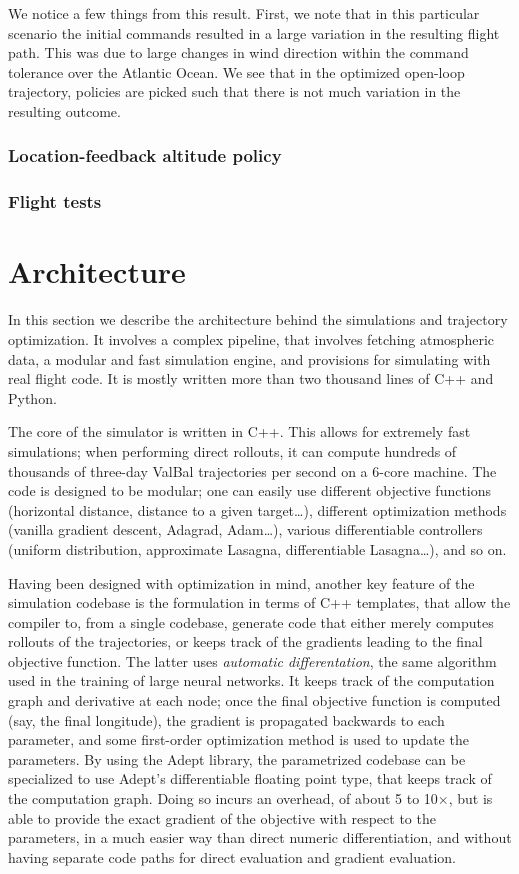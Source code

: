\documentclass[11pt]{scrartcl} %
\begin{document}
We notice a few things from this result. First, we note that in this particular scenario the initial commands resulted in a large variation in the resulting flight path. This was due to large changes in wind direction within the command tolerance over the Atlantic Ocean. We see that in the optimized open-loop trajectory, policies are picked such that there is not much variation in the resulting outcome. 
\subsubsection{Location-feedback altitude policy}
\subsubsection{Flight tests}


\newpage
\section{Architecture}
\label{arch}
In this section we describe the architecture behind the simulations and trajectory optimization. It involves a complex pipeline, that involves fetching atmospheric data, a modular and fast simulation engine, and provisions for simulating with real flight code. It is mostly written more than two thousand lines of C++ and Python.

The core of the simulator is written in C++. This allows for extremely fast simulations; when performing direct rollouts, it can compute hundreds of thousands of three-day ValBal trajectories per second on a 6-core machine. The code is designed to be modular; one can easily use different objective functions (horizontal distance, distance to a given target\dots), different optimization methods (vanilla gradient descent, Adagrad, Adam\dots), various differentiable controllers (uniform distribution, approximate Lasagna, differentiable Lasagna\dots), and so on.

Having been designed with optimization in mind, another key feature of the simulation codebase is the formulation in terms of C++ templates, that allow the compiler to, from a single codebase, generate code that either merely computes rollouts of the trajectories, or keeps track of the gradients leading to the final objective function. The latter uses \emph{automatic differentation}, the same algorithm used in the training of large neural networks. It keeps track of the computation graph and derivative at each node; once the final objective function is computed (say, the final longitude), the gradient is propagated backwards to each parameter, and some first-order optimization method is used to update the parameters. By using the Adept library, the parametrized codebase can be specialized to use Adept's differentiable floating point type, that keeps track of the computation graph. Doing so incurs an overhead, of about 5 to 10$\times$, but is able to provide the exact gradient of the objective with respect to the parameters, in a much easier way than direct numeric differentiation, and without having separate code paths for direct evaluation and gradient evaluation.
\end{document}
